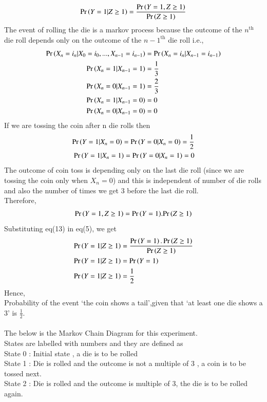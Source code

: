 \documentclass[journal,12pt,twocolumn]{IEEEtran}
\begin{document}
\begin{align}
    \Pr\left(Y=1|Z\geq 1\right)=\frac{\Pr\left(Y=1,Z\geq 1\right)}{\Pr\left(Z \geq 1\right)}
\end{align}
The event of rolling the die is a markov process because the outcome of the $n^{\text{th}}$ die roll depends only on the outcome of the ${n-1}^{\text{th}}$ die roll i.e.,
\begin{align}
       \Pr\left(X_n =i_n|X_0=i_0,...,X_{n-1}=i_{n-1}\right)&= \Pr\left(X_n=i_n|X_{n-1}=i_{n-1}\right)\\
       \Pr\left(X_n=1|X_{n-1}=1\right)&=\frac{1}{3}\\
       \Pr\left(X_n=0|X_{n-1}=1\right)&=\frac{2}{3}\\
       \Pr\left(X_n=1|X_{n-1}=0\right)&=0\\
       \Pr\left(X_n=0|X_{n-1}=0\right)&=0
\end{align}
If we are tossing the coin after n die rolls then
\begin{align}
       \Pr\left(Y=1|X_n =0\right)=\Pr\left(Y=0|X_n=0\right)=\frac{1}{2}\\
        \Pr\left(Y=1|X_n =1\right)=\Pr\left(Y=0|X_n=1\right)=0
\end{align}
The outcome of coin toss is depending only on the last die roll (since we are tossing the coin only when $X_n=0$) and this is independent of number of die rolls and also the number of times we get 3 before the last die roll.
\\Therefore,
\begin{align}
       \Pr\left(Y=1,Z\geq 1\right)={\Pr\left(Y=1\right)}.{\Pr\left(Z\geq 1\right)}
\end{align}
Substituting eq(13) in eq(5), we get
\begin{align}
    \Pr\left(Y=1|Z\geq 1\right)&=\frac{\Pr\left(Y=1\right).\Pr\left(Z\geq 1\right)}{\Pr\left(Z \geq 1\right)}\\
    \Pr\left(Y=1|Z \geq 1\right) &= \Pr\left(Y=1\right)\\
    \Pr\left(Y=1|Z \geq 1\right) &= \frac{1}{2}
\end{align}
Hence,
\\Probability of the event `the coin shows a tail',given that `at least one die shows a 3' is $\frac{1}{2}$.
\\
\\The below is the Markov Chain Diagram for this experiment.
\\ States are labelled with numbers and they are defined as
\\ State 0 : Initial state , a die is to be rolled
\\ State 1 : Die is rolled and the outcome is not a multiple of 3 , a coin is to be tossed next.
\\ State 2 : Die is rolled and the outcome is multiple of 3, the die is to be rolled again.
\end{document}
